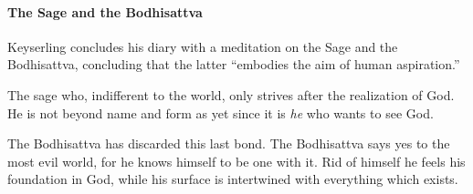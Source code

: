 \paragraph{The Sage and the Bodhisattva}


Keyserling concludes his diary with a meditation on the Sage and the Bodhisattva, concluding that the latter ``embodies the aim of human aspiration.''

\begin{quotationx}
The sage who, indifferent to the world, only strives after the realization of God. He is not beyond name and form as yet since it is \emph{he} who wants to see God.

The Bodhisattva has discarded this last bond. The Bodhisattva says yes to the most evil world, for he knows himself to be one with it. Rid of himself he feels his foundation in God, while his surface is intertwined with everything which exists.
\end{quotationx}




